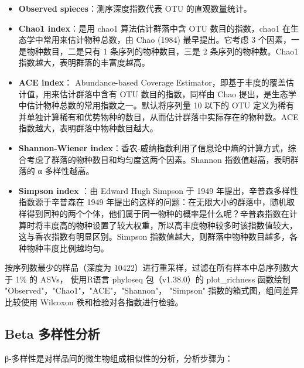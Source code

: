 \documentclass[supercite]{HustGraduPaper}
\begin{document}
\begin{itemize}
	\item {\songti \bfseries Observed spieces}：测序深度指数代表 OTU 的直观数量统计。
	\item {\songti \bfseries Chao1 index}：是用 chao1 算法估计群落中含 OTU 数目的指数，chao1 在生态学中常用来估计物种总数，由 Chao (1984) 最早提出\cite{chao1984}。它考虑 3 个因素，一是物种数目，二是只有 1 条序列的物种数目，三是 2 条序列的物种数。Chao1 指数越大，表明群落的丰富度越高。
	\item {\songti \bfseries ACE index}： Abundance-based Coverage Estimator，即基于丰度的覆盖估计值，用来估计群落中含有 OTU 数目的指数，同样由 Chao 提出\cite{ACE}，是生态学中估计物种总数的常用指数之一。默认将序列量 10 以下的 OTU 定义为稀有并单独计算稀有和优势物种的数目，从而估计群落中实际存在的物种数。ACE 指数越大，表明群落中物种数目越大。
	\item {\songti \bfseries Shannon-Wiener index}：香农-威纳指数利用了信息论中熵的计算方式，综合考虑了群落的物种数目和均匀度这两个因素\cite{shannon}。Shannon 指数值越高，表明群落的 α 多样性越高。
	\item {\songti \bfseries Simpson index} ：由 Edward Hugh Simpson 于 1949 年提出\cite{simpson}，辛普森多样性指数源于辛普森在 1949 年提出的这样的问题：在无限大小的群落中，随机取样得到同种的两个个体，他们属于同一物种的概率是什么呢？辛普森指数在计算时将丰度高的物种设置了较大权重，所以高丰度物种较多时该指数值较大，这与香农指数有明显区别。Simpson 指数值越大，则群落中物种数目越多，各种物种丰度比例越均匀。	 
\end{itemize}


按序列数最少的样品（深度为 10422）进行重采样，过滤在所有样本中总序列数大于 1\% 的 ASVs， 使用R语言 phyloseq 包\cite{mcmurdie2013phyloseq}（v1.38.0）的 plot\_richness 函数绘制 "Observed"，"Chao1"，"ACE"，"Shannon"， "Simpson" 指数的箱式图，组间差异比较使用 Wilcoxon 秩和检验\cite{wilcoxon}对各指数进行检验。

\subsection{Beta 多样性分析}

β-多样性是对样品间的微生物组成相似性的分析，分析步骤为：
\end{document}
